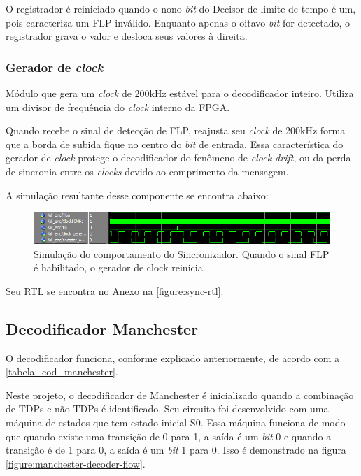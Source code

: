 	O registrador é reiniciado quando o nono \textit{bit} do Decisor de limite de tempo é um, pois caracteriza um FLP inválido. Enquanto apenas o oitavo \textit{bit} for detectado, o registrador grava o valor e desloca seus valores à direita.
	\subsubsection{Gerador de \textit{clock}}
	Módulo que gera um \textit{clock} de 200kHz estável para o decodificador inteiro. Utiliza um divisor de frequência do \textit{clock} interno da FPGA.
	
	Quando recebe o sinal de detecção de FLP, reajusta seu \textit{clock} de 200kHz forma que a borda de subida fique no centro do \textit{bit} de entrada. Essa característica do gerador de \textit{clock} protege o decodificador do fenômeno de \textit{clock drift}, ou da perda de sincronia entre os \textit{clocks} devido ao comprimento da mensagem.
	
	A simulação resultante desse componente se encontra abaixo:
	\begin{figure}[h]
		\caption{\label{figure:sync-simulation}Simulação do comportamento do Sincronizador. Quando o sinal FLP é habilitado, o gerador de clock reinicia.}
		\centering
		\includegraphics[width=1\textwidth]{sync/simulation.png}
	\end{figure}
	
	Seu RTL se encontra no Anexo na \autoref{figure:sync-rtl}.
	
	\subsection{Decodificador Manchester}
	
	O decodificador funciona, conforme explicado anteriormente, de acordo com a \autoref{tabela_cod_manchester}.
	
	Neste projeto, o decodificador de Manchester é inicializado quando a combinação de TDPs e não TDPs é identificado. Seu circuito foi desenvolvido com uma máquina de estados que tem estado inicial S0. Essa máquina funciona de modo que quando existe uma transição de 0 para 1, a saída é um \textit{bit} 0 e quando a transição é de 1 para 0, a saída é um \textit{bit} 1 para 0. Isso é demonstrado na figura \autoref{figure:manchester-decoder-flow}. 
		
